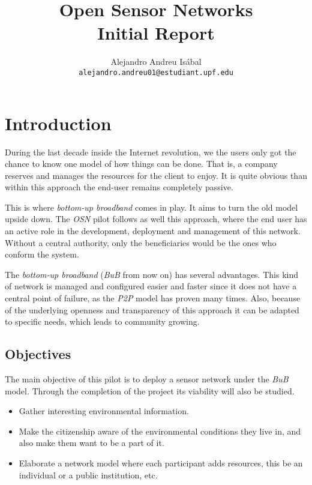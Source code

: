 \documentclass[a4paper,english]{article}
\title{
    Open Sensor Networks\\
    Initial Report
}
\author{
    Alejandro Andreu Isábal\\
    \texttt{alejandro.andreu01@estudiant.upf.edu}
}
\begin{document}
    \maketitle

    \section{Introduction}

        During the last decade inside the Internet revolution, we the users only got the chance to know one model of how things can be done. That is, a company reserves and manages the resources for the client to enjoy. It is quite obvious than within this approach the end-user remains completely passive.

        This is where \emph{bottom-up broadband} comes in play. It aims to turn the old model upside down. The \emph{OSN} pilot follows as well this approach, where the end user has an active role in the development, deployment and management of this network. Without a central authority, only the beneficiaries would be the ones who conform the system.

        The \emph{bottom-up broadband} (\emph{BuB} from now on) has several advantages. This kind of network is managed and configured easier and faster since it does not have a central point of failure, as the \emph{P2P} model has proven many times. Also, because of the underlying openness and transparency of this approach it can be adapted to specific needs, which leads to community growing.


    \subsection{Objectives}

        The main objective of this pilot is to deploy a sensor network under the \emph{BuB} model. Through the completion of the project its viability will also be studied.

        \begin{itemize}
            \item Gather interesting environmental information.
            \item Make the citizenship aware of the environmental conditions they live in, and also make them want to be a part of it.
            \item Elaborate a network model where each participant adds resources, this be an individual or a public institution, etc.
        \end{itemize}
\end{document}
